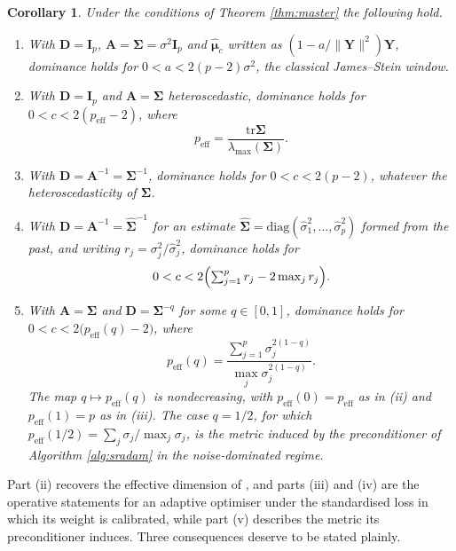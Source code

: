 \documentclass[a4paper,fleqn]{cas-sc}
\theoremstyle{plain}
\newtheorem{corollary}[theorem]{Corollary}
\theoremstyle{definition}
\theoremstyle{remark}
\newcommand{\rev}[1]{#1}
\newenvironment{revblock}{}{}
\newcommand{\peff}{p_{\mathrm{eff}}}
\newcommand{\peffq}[1]{p_{\mathrm{eff}}(#1)}
\newcommand{\tr}{\mathrm{tr}}
\newcommand{\diag}{\mathrm{diag}}
\begin{document}
\begin{corollary}
\label{cor:cases}
Under the conditions of Theorem \ref{thm:master} the following hold.
\begin{enumerate}
\item[(i)] With $\bm D=\bm I_p$, $\bm A=\bm\Sigma=\sigma^2\bm I_p$ and $\hat{\bm\mu}_c$ written as $(1-a/\|\bm Y\|^2)\bm Y$, dominance holds for $0<a<2(p-2)\sigma^2$, the classical James--Stein window.
\item[(ii)] With $\bm D=\bm I_p$ and $\bm A=\bm\Sigma$ heteroscedastic, dominance holds for $0<c<2(\peff-2)$, where
\begin{equation}
\peff=\frac{\tr\bm\Sigma}{\lambda_{\max}(\bm\Sigma)} .
\end{equation}
\item[(iii)] With $\bm D=\bm A^{-1}=\bm\Sigma^{-1}$, dominance holds for $0<c<2(p-2)$, whatever the heteroscedasticity of $\bm\Sigma$.
\item[(iv)] With $\bm D=\bm A^{-1}=\widehat{\bm\Sigma}^{-1}$ for an estimate $\widehat{\bm\Sigma}=\diag(\hat\sigma^2_1,\dots,\hat\sigma^2_p)$ formed from the past, and writing $r_j=\sigma^2_j/\hat\sigma^2_j$, dominance holds for
\begin{equation}
\label{eq:plugin_window}
0<c<2\Bigl(\textstyle\sum_{j=1}^{p}r_j-2\max_{j}r_j\Bigr) .
\end{equation}
\item[(v)] With $\bm A=\bm\Sigma$ and $\bm D=\bm\Sigma^{-q}$ for some $q\in[0,1]$, dominance holds for $0<c<2\bigl(\peffq{q}-2\bigr)$, where
\begin{equation}
\label{eq:peff_q}
\peffq{q}=\frac{\sum_{j=1}^{p}\sigma_j^{2(1-q)}}{\max_{j}\sigma_j^{2(1-q)}} .
\end{equation}
The map $q\mapsto\peffq{q}$ is nondecreasing, with $\peffq{0}=\peff$ as in (ii) and $\peffq{1}=p$ as in (iii). The case $q=1/2$, for which $\peffq{1/2}=\sum_j\sigma_j/\max_j\sigma_j$, is the metric induced by the preconditioner of Algorithm \ref{alg:sradam} in the noise-dominated regime.
\end{enumerate}
\end{corollary}

Part (ii) recovers the effective dimension of \citet{bock1975}, and parts (iii) and (iv) are the operative statements for an adaptive optimiser\rev{ under the standardised loss in which its weight is calibrated, while part (v) describes the metric its preconditioner induces}. Three consequences deserve to be stated plainly.
\end{document}
